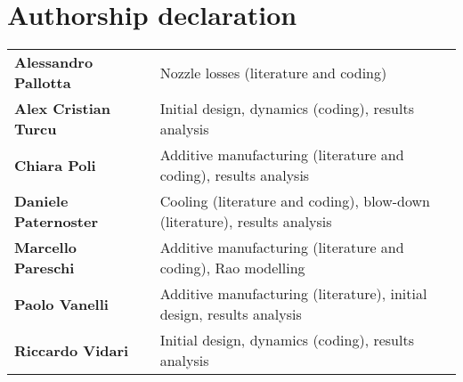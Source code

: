 \section*{Authorship declaration}

\vspace*{5mm}

{
\renewcommand{\arraystretch}{1.7}
\begin{tabular}{lll}
    \textbf{Alessandro Pallotta} & &
    Nozzle losses (literature and coding)
    \\
    \textbf{Alex Cristian Turcu} & &
    Initial design, dynamics (coding), results analysis
    \\
    \textbf{Chiara Poli} & &
    Additive manufacturing (literature and coding), results analysis
    \\
    \textbf{Daniele Paternoster} & &
    Cooling (literature and coding), blow-down (literature), results analysis
    \\
    \textbf{Marcello Pareschi} & &
    Additive manufacturing (literature and coding), Rao modelling
    \\
    \textbf{Paolo Vanelli} & &
    Additive manufacturing (literature), initial design, results analysis
    \\
    \textbf{Riccardo Vidari} & &
    Initial design, dynamics (coding), results analysis
\end{tabular}
}